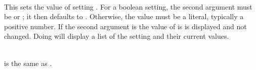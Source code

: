 \begin{description}
\item {}\\
    This sets the value of setting .
    For a boolean setting, the second argument must be  or
    ; it then defaults to .
    Otherwise, the value must be a literal, typically a positive number.
    If the second argument is  the value of  is
    is displayed and not changed.
    Doing  will display a list of the setting and
    their current values.

\item {}\\
     is the same as
    .
\end{description}


